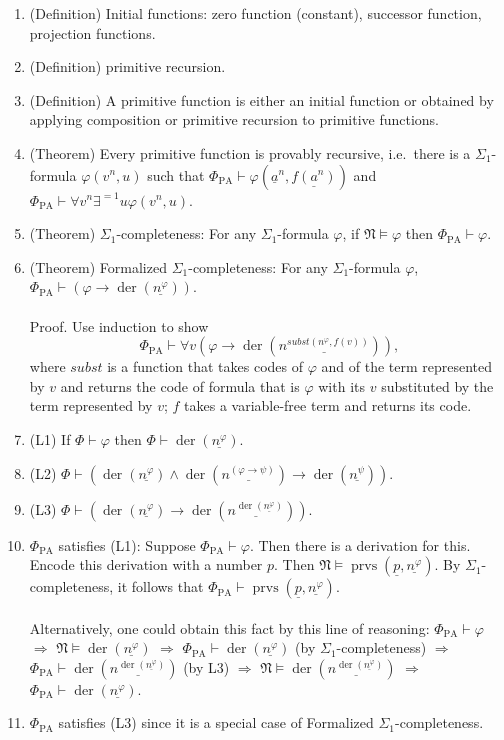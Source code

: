 \documentclass[leqno]{report}
\newcommand{\natstr}{\mathfrak{N}}
\newcommand{\limply}{\mathbin{\rightarrow}} %
\newcommand{\derives}{\mathbin{\vdash}}
\newcommand{\satisfies}{\mathbin{\models}}
\newcommand{\formulacode}[1]{n^{#1}}
\newcommand{\pa}{\mathrm{PA}}
\newcommand{\formal}[1]{\underline{#1}} %
\newcommand{\proves}[2]{\mathop{\mathrm{prvs}}(#1, #2)} %
\newcommand{\der}[1]{\mathop{\mathrm{der}}(\formal{\formulacode{#1}})}
\begin{document}
\begin{enumerate}
%
\item (Definition) Initial functions: zero function (constant), successor function, projection functions.
%
\item (Definition) primitive recursion.
%
\item (Definition) A primitive function is either an initial function or obtained by applying composition or primitive recursion to primitive functions.
%
\item (Theorem) Every primitive function is provably recursive, i.e.\ there is a $\Sigma_1$-formula $\varphi(v^n, u)$ such that $\Phi_\pa \derives \varphi(\formal{a}^n, \formal{f(a^n)})$ and $\Phi_\pa \derives \forall v^n \exists^{=1}u \varphi(v^n, u)$.
%
\item (Theorem) $\Sigma_1$-completeness: For any $\Sigma_1$-formula $\varphi$, if $\natstr \satisfies \varphi$ then $\Phi_\pa \derives \varphi$.
%
\item (Theorem) Formalized $\Sigma_1$-completeness: For any $\Sigma_1$-formula $\varphi$, $\Phi_\pa \derives (\varphi \limply \der{\varphi})$.\\
\ \\
Proof. Use induction to show
\[
\Phi_\pa \derives \forall v (\varphi \limply \der{subst(\formulacode{\varphi}, f(v))}),
\]
where $subst$ is a function that takes codes of $\varphi$ and of the term represented by $v$ and returns the code of formula that is $\varphi$ with its $v$ substituted by the term represented by $v$; $f$ takes a variable-free term and returns its code.
%
\item (L1) If $\Phi \derives \varphi$ then $\Phi \derives \der{\varphi}$.
%
\item (L2) $\Phi \derives (\der{\varphi} \land \der{(\varphi \limply \psi)} \limply \der{\psi})$.
%
\item (L3) $\Phi \derives (\der{\varphi} \limply \der{\der{\varphi}})$.
%
\item $\Phi_\pa$ satisfies (L1): Suppose $\Phi_\pa \derives \varphi$. Then there is a derivation for this. Encode this derivation with a number $p$. Then $\natstr \satisfies \proves{\formal{p}}{\formal{\formulacode{\varphi}}}$. By $\Sigma_1$-completeness, it follows that $\Phi_\pa \derives \proves{\formal{p}}{\formal{\formulacode{\varphi}}}$.\\
\ \\
Alternatively, one could obtain this fact by this line of reasoning: $\Phi_\pa \derives \varphi$ $\Rightarrow$ $\natstr \satisfies \der{\varphi}$ $\Rightarrow$ $\Phi_\pa \derives \der{\varphi}$ (by $\Sigma_1$-completeness) $\Rightarrow$ $\Phi_\pa \derives \der{\der{\varphi}}$ (by L3) $\Rightarrow$ $\natstr \satisfies \der{\der{\varphi}}$ $\Rightarrow$ $\Phi_\pa \derives \der{\varphi}$.
%
\item $\Phi_\pa$ satisfies (L3) since it is a special case of Formalized $\Sigma_1$-completeness.
%
\end{enumerate}
\end{document}
